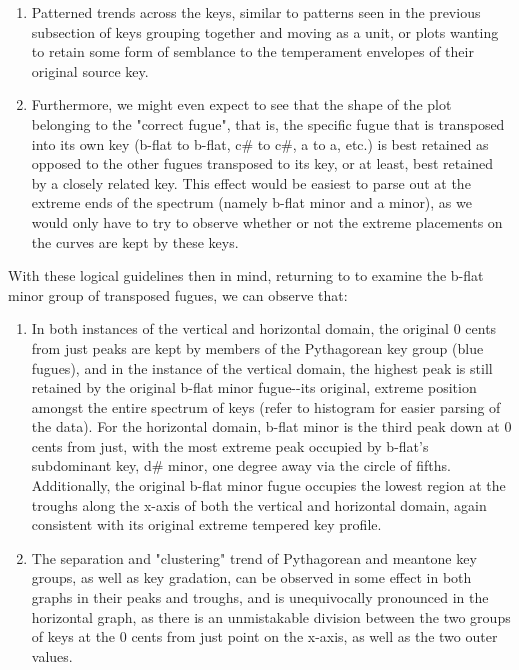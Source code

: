 \begin{enumerate}
\def\labelenumi{\arabic{enumi}.}
\tightlist
\item
  Patterned trends across the keys, similar to patterns seen in the
  previous subsection of keys grouping together and moving as a unit, or
  plots wanting to retain some form of semblance to the temperament
  envelopes of their original source key.
\item
  Furthermore, we might even expect to see that the shape of the plot
  belonging to the "correct fugue", that is, the specific fugue that is
  transposed into its own key (b-flat to b-flat, c\# to c\#, a to a,
  etc.) is best retained as opposed to the other fugues transposed to
  its key, or at least, best retained by a closely related key. This
  effect would be easiest to parse out at the extreme ends of the
  spectrum (namely b-flat minor and a minor), as we would only have to
  try to observe whether or not the extreme placements on the curves are
  kept by these keys.
\end{enumerate}

With these logical guidelines then in mind, returning to to examine the
b-flat minor group of transposed fugues, we can observe that:

\begin{enumerate}
\def\labelenumi{\arabic{enumi}.}
\tightlist
\item
  In both instances of the vertical and horizontal domain, the original
  0 cents from just peaks are kept by members of the Pythagorean key
  group (blue fugues), and in the instance of the vertical domain, the
  highest peak is still retained by the original b-flat minor
  fugue-\/-its original, extreme position amongst the entire spectrum of
  keys (refer to histogram for easier parsing of the data). For the
  horizontal domain, b-flat minor is the third peak down at 0 cents from
  just, with the most extreme peak occupied by b-flat's subdominant key,
  d\# minor, one degree away via the circle of fifths. Additionally, the
  original b-flat minor fugue occupies the lowest region at the troughs
  along the x-axis of both the vertical and horizontal domain, again
  consistent with its original extreme tempered key profile.
\item
  The separation and "clustering" trend of Pythagorean and meantone key
  groups, as well as key gradation, can be observed in some effect in
  both graphs in their peaks and troughs, and is unequivocally
  pronounced in the horizontal graph, as there is an unmistakable
  division between the two groups of keys at the 0 cents from just point
  on the x-axis, as well as the two outer values.
\end{enumerate}

